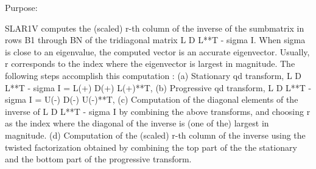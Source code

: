  \begin{DoxyParagraph}{Purpose\+: }
\begin{DoxyVerb} SLAR1V computes the (scaled) r-th column of the inverse of
 the sumbmatrix in rows B1 through BN of the tridiagonal matrix
 L D L**T - sigma I. When sigma is close to an eigenvalue, the
 computed vector is an accurate eigenvector. Usually, r corresponds
 to the index where the eigenvector is largest in magnitude.
 The following steps accomplish this computation :
 (a) Stationary qd transform,  L D L**T - sigma I = L(+) D(+) L(+)**T,
 (b) Progressive qd transform, L D L**T - sigma I = U(-) D(-) U(-)**T,
 (c) Computation of the diagonal elements of the inverse of
     L D L**T - sigma I by combining the above transforms, and choosing
     r as the index where the diagonal of the inverse is (one of the)
     largest in magnitude.
 (d) Computation of the (scaled) r-th column of the inverse using the
     twisted factorization obtained by combining the top part of the
     the stationary and the bottom part of the progressive transform.\end{DoxyVerb}
 
\end{DoxyParagraph}

